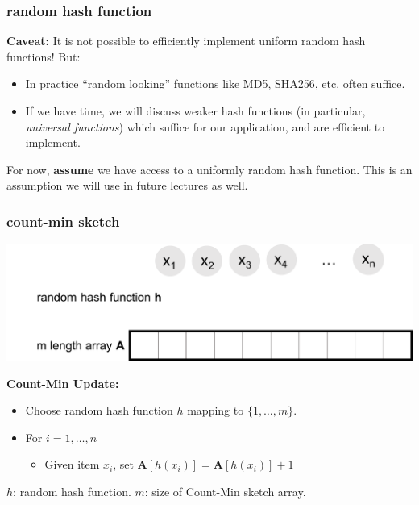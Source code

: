 \documentclass[]{beamer}
\newcommand{\bv}[1]{\mathbf{#1}}
\begin{document}
	\begin{frame}
		\frametitle{random hash function}
		\textbf{Caveat:}
		It is not possible to efficiently implement uniform random hash functions! But:
		\begin{itemize}
			\item In practice ``random looking'' functions like MD5, SHA256, etc. often suffice.
			\item If we have time, we will discuss weaker hash functions (in particular, \emph{universal functions}) which suffice for our application, and are efficient to implement.
		\end{itemize}	
		For now, \textbf{assume} we have access to a uniformly random hash function. This is an assumption we will use in future lectures as well. 
	\end{frame}
	
	
	
	\begin{frame}
		\frametitle{count-min sketch}
		\includegraphics[width=.85\textwidth]{cm0.png}
		
		\textbf{Count-Min Update:}
		\begin{itemize}
			\item Choose random hash function $h$ mapping to $\{1, \ldots, m\}$.
			\item For $i = 1, \ldots, n$
			\begin{itemize}
				\item Given item $x_i$, set $\bv{A}[h(x_i)] = \bv{A}[h(x_i)] + 1$
			\end{itemize}
		\end{itemize}
		
		
		\vspace{3em}
		\begin{block}{\vspace*{-3ex}}
			${h}$: random hash function. $m$: size of Count-Min sketch array.
		\end{block}
	\end{frame}
	
\end{document}
